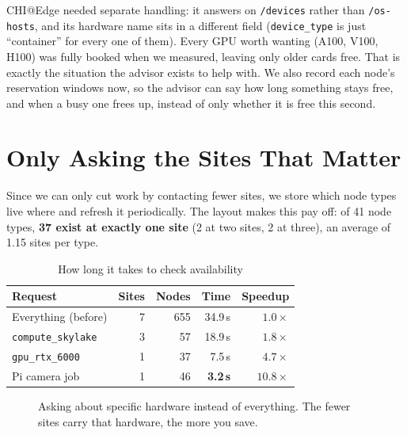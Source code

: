 \documentclass[conference]{IEEEtran}
\begin{document}
CHI@Edge needed separate handling: it answers on \texttt{/devices} rather than
\texttt{/os-hosts}, and its hardware name sits in a different field
(\texttt{device\_type} is just ``container'' for every one of them). Every GPU
worth wanting (A100, V100, H100) was fully booked when we measured, leaving
only older cards free. That is exactly the situation the advisor exists to help
with. We also record each node's reservation windows now, so the advisor can
say how long something stays free, and when a busy one frees up, instead of
only whether it is free this second.

\section{Only Asking the Sites That Matter}

Since we can only cut work by contacting fewer sites, we store which node types
live where and refresh it periodically. The layout makes this pay off: of 41
node types, \textbf{37 exist at exactly one site} (2 at two sites, 2 at three),
an average of 1.15 sites per type.

\begin{table}[h]
\caption{How long it takes to check availability}
\label{tab:speed}
\centering\footnotesize
\begin{tabular}{@{}lrrrr@{}}
\toprule
Request & Sites & Nodes & Time & Speedup \\
\midrule
Everything (before)        & 7 & 655 & 34.9\,s & $1.0\times$ \\
\texttt{compute\_skylake}  & 3 & 57  & 18.9\,s & $1.8\times$ \\
\texttt{gpu\_rtx\_6000}    & 1 & 37  & 7.5\,s  & $4.7\times$ \\
Pi camera job              & 1 & 46  & \textbf{3.2\,s} & $\mathbf{10.8\times}$ \\
\bottomrule
\end{tabular}
\end{table}

\begin{figure}[h]
\centering
{}
\caption{Asking about specific hardware instead of everything. The fewer sites
carry that hardware, the more you save.}
\label{fig:speed}
\end{figure}
\end{document}
